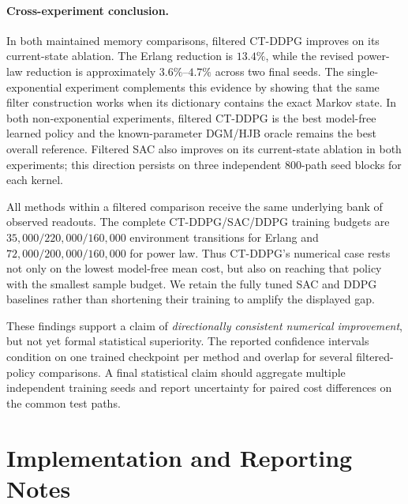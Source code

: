 \documentclass[11pt]{article}
\begin{document}
\paragraph{Cross-experiment conclusion.}
In both maintained memory comparisons, filtered CT-DDPG improves on its
current-state ablation. The Erlang reduction is \(13.4\%\), while the revised
power-law reduction is approximately \(3.6\%\)--\(4.7\%\) across two final
seeds. The single-exponential experiment complements this evidence by showing
that the same filter construction works when its dictionary contains the exact
Markov state. In both non-exponential experiments, filtered CT-DDPG is the best
model-free learned policy and the known-parameter DGM/HJB oracle remains the
best overall reference. Filtered SAC also improves on its current-state
ablation in both experiments; this direction persists on three independent
800-path seed blocks for each kernel.

All methods within a filtered comparison receive the same underlying bank of
observed readouts. The complete CT-DDPG/SAC/DDPG training budgets are
\(35{,}000/220{,}000/160{,}000\) environment transitions for Erlang and
\(72{,}000/200{,}000/160{,}000\) for power law. Thus CT-DDPG's numerical case
rests not only on the lowest model-free mean cost, but also on reaching that
policy with the smallest sample budget. We retain the fully tuned SAC and DDPG
baselines rather than shortening their training to amplify the displayed gap.

These findings support a claim of \emph{directionally consistent numerical improvement}, but
not yet formal statistical superiority. The reported confidence intervals
condition on one trained checkpoint per method and overlap for several
filtered-policy comparisons. A final statistical claim should aggregate
multiple independent training seeds and report uncertainty for paired cost
differences on the common test paths.

\section{Implementation and Reporting Notes}
\end{document}

